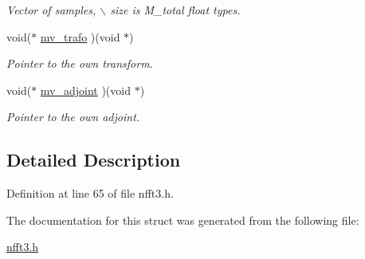 \begin{CompactItemize}
\begin{CompactList}\small\item\em Vector of samples, $\backslash$ size is M\_\-total float types. \item\end{CompactList}\item 
\hypertarget{structmv__plan__complex_3ce7e002a8eac0ddc6271cfe21df9f3b}{
void($\ast$ \hyperlink{structmv__plan__complex_3ce7e002a8eac0ddc6271cfe21df9f3b}{mv\_\-trafo} )(void $\ast$)}
\label{structmv__plan__complex_3ce7e002a8eac0ddc6271cfe21df9f3b}

\begin{CompactList}\small\item\em Pointer to the own transform. \item\end{CompactList}\item 
\hypertarget{structmv__plan__complex_6a34e60b689f473004f8ccf083a21f04}{
void($\ast$ \hyperlink{structmv__plan__complex_6a34e60b689f473004f8ccf083a21f04}{mv\_\-adjoint} )(void $\ast$)}
\label{structmv__plan__complex_6a34e60b689f473004f8ccf083a21f04}

\begin{CompactList}\small\item\em Pointer to the own adjoint. \item\end{CompactList}\end{CompactItemize}


\subsection{Detailed Description}


Definition at line 65 of file nfft3.h.

The documentation for this struct was generated from the following file:\begin{CompactItemize}
\item 
\hyperlink{nfft3_8h}{nfft3.h}\end{CompactItemize}
